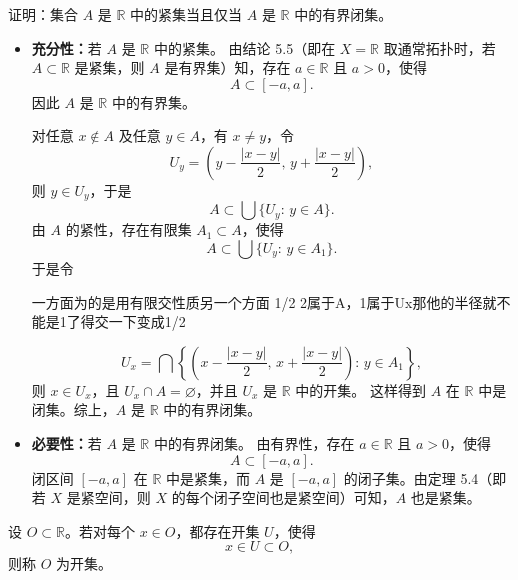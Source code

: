\begin{homework}[4]
证明：集合 $A$ 是 $\mathbb{R}$ 中的紧集当且仅当 $A$ 是 $\mathbb{R}$ 中的有界闭集。
\end{homework}
\begin{solution}
\begin{itemize}
  \item \textbf{充分性：}若 $A$ 是 $\mathbb{R}$ 中的紧集。  
  由结论 5.5（即在 $X=\mathbb{R}$ 取通常拓扑时，若 $A\subset\mathbb{R}$ 是紧集，则 $A$ 是有界集）知，存在 $a\in\mathbb{R}$ 且 $a>0$，使得
  \[
    A\subset[-a,a].
  \]
  因此 $A$ 是 $\mathbb{R}$ 中的有界集。

  对任意 $x\notin A$ 及任意 $y\in A$，有 $x\neq y$，令
  \[
    U_y=\left(y-\frac{|x-y|}{2},\,y+\frac{|x-y|}{2}\right),
  \]
  则 $y\in U_y$，于是
  \[
    A\subset\bigcup\{U_y:\,y\in A\}.
  \]
  由 $A$ 的紧性，存在有限集 $A_1\subset A$，使得
  \[
    A\subset\bigcup\{U_y:\,y\in A_1\}.
  \]
  于是令
  \begin{dxtips}
      一方面为的是用有限交性质另一个方面 1/2 2属于A，1属于Ux那他的半径就不能是1了得交一下变成1/2
  \end{dxtips}
  \[
    U_x=\bigcap\left\{\left(x-\frac{|x-y|}{2},\,x+\frac{|x-y|}{2}\right):\,y\in A_1\right\},
  \]
  则 $x\in U_x$，且 $U_x\cap A=\varnothing$，并且 $U_x$ 是 $\mathbb{R}$ 中的开集。  
  这样得到 $A$ 在 $\mathbb{R}$ 中是闭集。综上，$A$ 是 $\mathbb{R}$ 中的有界闭集。

  \item \textbf{必要性：}若 $A$ 是 $\mathbb{R}$ 中的有界闭集。  
  由有界性，存在 $a\in\mathbb{R}$ 且 $a>0$，使得
  \[
    A\subset[-a,a].
  \]
  闭区间 $[-a,a]$ 在 $\mathbb{R}$ 中是紧集，而 $A$ 是 $[-a,a]$ 的闭子集。由定理 5.4（即若 $X$ 是紧空间，则 $X$ 的每个闭子空间也是紧空间）可知，$A$ 也是紧集。
\end{itemize}
\end{solution}
\begin{definition}
设 $O\subset\mathbb{R}$。若对每个 $x\in O$，都存在开集 $U$，使得
\[
x\in U\subset O,
\]
则称 $O$ 为开集。
\end{definition}

